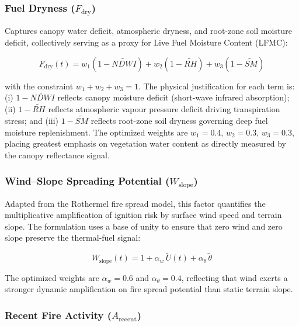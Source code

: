 \documentclass[conference]{IEEEtran}
\begin{document}
\subsubsection{Fuel Dryness ($F_{\mathrm{dry}}$)}

Captures canopy water deficit, atmospheric dryness, and root-zone soil moisture
deficit, collectively serving as a proxy for Live Fuel Moisture Content (LFMC):

\begin{equation}
F_{\mathrm{dry}}(t) = w_1\!\left(1 - \widetilde{\mathit{NDWI}}\right)
+ w_2\!\left(1 - \widetilde{\mathit{RH}}\right)
+ w_3\!\left(1 - \widetilde{\mathit{SM}}\right)
\label{eq:fdry}
\end{equation}

with the constraint $w_1 + w_2 + w_3 = 1$. The physical justification for each
term is: (i) $1 - \widetilde{\mathit{NDWI}}$ reflects canopy moisture deficit
(short-wave infrared absorption); (ii) $1 - \widetilde{\mathit{RH}}$ reflects
atmospheric vapour pressure deficit driving transpiration stress; and
(iii) $1 - \widetilde{\mathit{SM}}$ reflects root-zone soil dryness governing deep
fuel moisture replenishment. The optimized weights are $w_1 = 0.4$, $w_2 = 0.3$,
$w_3 = 0.3$, placing greatest emphasis on vegetation water content as directly
measured by the canopy reflectance signal.

\subsubsection{Wind--Slope Spreading Potential ($W_{\mathrm{slope}}$)}

Adapted from the Rothermel fire spread model, this factor quantifies the
multiplicative amplification of ignition risk by surface wind speed and terrain
slope. The formulation uses a base of unity to ensure that zero wind and zero slope
preserve the thermal-fuel signal:

\begin{equation}
W_{\mathrm{slope}}(t) = 1 + \alpha_w\,\tilde{U}(t) + \alpha_\theta\,\tilde{\theta}
\label{eq:wslope}
\end{equation}

The optimized weights are $\alpha_w = 0.6$ and $\alpha_\theta = 0.4$, reflecting
that wind exerts a stronger dynamic amplification on fire spread potential than
static terrain slope.

\subsubsection{Recent Fire Activity ($A_{\mathrm{recent}}$)}
\end{document}
